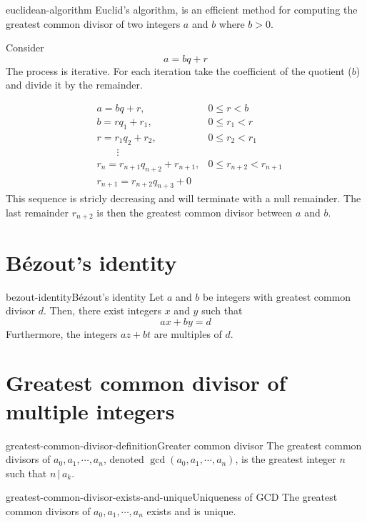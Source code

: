 \documentclass[preview]{standalone}
\newcommand{\divides}{\,|\,}
\begin{document}
\begin{snippet}{euclidean-algorithm}
Euclid's algorithm, is an efficient method for computing the greatest common divisor of two integers
\(a\) and \(b\) where \(b > 0\).

Consider
\[
    a = bq + r
\]
The process is iterative.
For each iteration take the coefficient of the quotient (\(b\)) and divide it by the remainder.

\begin{align*}
    &a = bq + r, &0 \leq r < b \\
    &b = rq_1 + r_1, &0 \leq r_1 < r \\
    &r = r_1q_2 + r_2, &0 \leq r_2 < r_1 \\
    \phantom{ } &\qquad \vdots & \\
    &r_n = r_{n+1}q_{n+2} + r_{n+1}, &0 \leq r_{n+2} < r_{n+1} \\
    &r_{n+1} = r_{n+2}q_{n+3} + 0&
\end{align*}
This sequence is stricly decreasing and will terminate with a null remainder.
The last remainder \(r_{n+2}\) is then the greatest common divisor between \(a\) and \(b\).
\end{snippet}

\section{Bézout's identity}

\begin{snippettheorem}{bezout-identity}{Bézout's identity}
    Let \(a\) and \(b\) be integers with greatest common divisor \(d\).
    Then, there exist integers \(x\) and \(y\) such that
    \[
        ax+by=d
    \]
    Furthermore, the integers \(az+bt\) are multiples of \(d\).
\end{snippettheorem}

\section{Greatest common divisor of multiple integers}

\begin{snippetdefinition}{greatest-common-divisor-definition}{Greater common divisor}
The greatest common divisors of \(a_0, a_1, \cdots, a_n\), denoted \(\gcd(a_0, a_1, \cdots, a_n)\),
is the greatest integer \(n\) such that \(n \divides a_k\).
\end{snippetdefinition}

\begin{snippetproposition}{greatest-common-divisor-exists-and-unique}{Uniqueness of GCD}
    The greatest common divisors of \(a_0, a_1, \cdots, a_n\) exists and is unique.
\end{snippetproposition}
\end{document}
